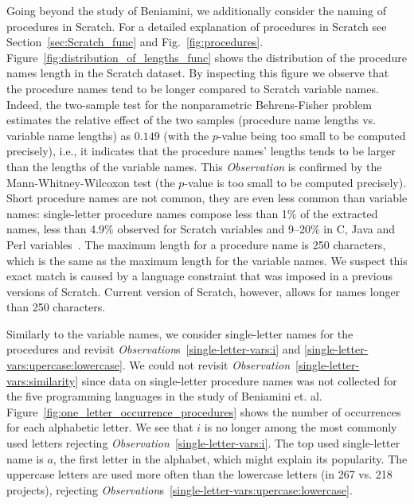 \documentclass[conference]{IEEEtran}
\begin{document}
Going beyond the study of Beniamini, we additionally consider the naming of procedures in Scratch. 
For a detailed explanation of procedures in Scratch see Section~\ref{sec:Scratch_func} and Fig.~\ref{fig:procedures}. Figure~\ref{fig:distribution_of_lengths_func} shows the distribution of the procedure names length in the Scratch dataset. 
By inspecting this figure we observe that the procedure names tend to be longer compared to Scratch variable names.
Indeed, the two-sample test for the nonparametric Behrens-Fisher problem estimates the relative effect of the two samples (procedure name lengths vs. variable name lengths) as $0.149$ (with the $p$-value being too small to be computed precisely), i.e., it indicates that the procedure names' lengths tends to be larger than the lengths of the variable names. 
This \emph{Observation} is confirmed by the Mann-Whitney-Wilcoxon test (the $p$-value is too small to be computed precisely).
Short procedure names are not common, they are even less common than variable names: single-letter procedure names compose less than 1\% of the extracted names, less than 4.9\% observed for Scratch variables and 9--20\% in C, Java and Perl variables~\cite{Beniamini}. 
The maximum length for a procedure name is 250 characters, which is the same as the maximum length for the variable names. 
We suspect this exact match is caused by a language constraint that was imposed in a previous versions of Scratch. 
Current version of Scratch, however, allows for names longer than 250 characters. 

Similarly to the variable names, we consider single-letter names for the procedures and revisit \emph{Observation}s~\ref{single-letter-vars:i} and \ref{single-letter-vars:upercase:lowercase}. 
We could not revisit \emph{Observation}~\ref{single-letter-vars:similarity} since data on single-letter procedure names was not collected for the five programming languages in the study of Beniamini et. al.
Figure~\ref{fig:one_letter_occurrence_procedures} shows the number of occurrences for each alphabetic letter. 
We see that $i$ is no longer among the most commonly used letters rejecting \emph{Observation}~\ref{single-letter-vars:i}.
The top used single-letter name is $a$, the first letter in the alphabet, which might explain its popularity.
The uppercase letters are used more often than the lowercase letters (in 267 vs. 218 projects), rejecting \emph{Observation}s~\ref{single-letter-vars:upercase:lowercase}.
\end{document}
